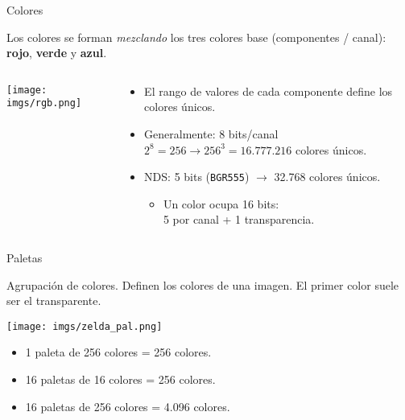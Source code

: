 \begin{frame}{Colores}
    \begin{block}{}
        Los colores se forman \textit{mezclando} los tres colores base (componentes / canal): \textbf{rojo}, \textbf{verde} y \textbf{azul}.
    \end{block}
    \begin{columns}
    \begin{column}{0.2\textwidth}
        \centering
        \texttt{[image: imgs/rgb.png]}
    \end{column}
    \begin{column}{0.8\textwidth}
        \small
        \begin{itemize}
            \item<2-> El rango de valores de cada componente define los colores únicos.
            \item<3-> Generalmente: 8 bits/canal \\
            $2^8=256\rightarrow 256^3=16.777.216$ colores únicos.
            \item<4-> NDS: 5 bits (\texttt{BGR555}) $\rightarrow$ 32.768 colores únicos.
            \begin{itemize}
                \item<4-> Un color ocupa 16 bits:\\
                5 por canal + 1 transparencia.
            \end{itemize}
        \end{itemize}
    \end{column}
    \end{columns}
\end{frame}

\begin{frame}{Paletas}
    \begin{block}{}
        Agrupación de colores. Definen los colores de una imagen. El primer color suele ser el transparente.
    \end{block}
    {\centering\texttt{[image: imgs/zelda\_pal.png]}\\}
    \begin{itemize}
        \item<2-> 1 paleta de 256 colores = 256 colores.
        \item<3-> 16 paletas de 16 colores = 256 colores.
        \item<4-> 16 paletas de 256 colores = 4.096 colores.
    \end{itemize}
\end{frame}


